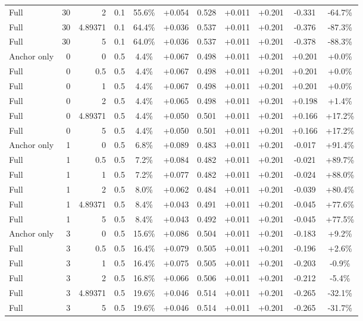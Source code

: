 \begin{table}[htbp]
\begin{tabular}{lrrrccccccc}
Full & 30 & 2 & 0.1 & 55.6\% & +0.054 & 0.528 & +0.011 & +0.201 & -0.331 & -64.7\% \\
Full & 30 & 4.89371 & 0.1 & 64.4\% & +0.036 & 0.537 & +0.011 & +0.201 & -0.376 & -87.3\% \\
Full & 30 & 5 & 0.1 & 64.0\% & +0.036 & 0.537 & +0.011 & +0.201 & -0.378 & -88.3\% \\
Anchor only & 0 & 0 & 0.5 & 4.4\% & +0.067 & 0.498 & +0.011 & +0.201 & +0.201 & +0.0\% \\
Full & 0 & 0.5 & 0.5 & 4.4\% & +0.067 & 0.498 & +0.011 & +0.201 & +0.201 & +0.0\% \\
Full & 0 & 1 & 0.5 & 4.4\% & +0.067 & 0.498 & +0.011 & +0.201 & +0.201 & +0.0\% \\
Full & 0 & 2 & 0.5 & 4.4\% & +0.065 & 0.498 & +0.011 & +0.201 & +0.198 & +1.4\% \\
Full & 0 & 4.89371 & 0.5 & 4.4\% & +0.050 & 0.501 & +0.011 & +0.201 & +0.166 & +17.2\% \\
Full & 0 & 5 & 0.5 & 4.4\% & +0.050 & 0.501 & +0.011 & +0.201 & +0.166 & +17.2\% \\
Anchor only & 1 & 0 & 0.5 & 6.8\% & +0.089 & 0.483 & +0.011 & +0.201 & -0.017 & +91.4\% \\
Full & 1 & 0.5 & 0.5 & 7.2\% & +0.084 & 0.482 & +0.011 & +0.201 & -0.021 & +89.7\% \\
Full & 1 & 1 & 0.5 & 7.2\% & +0.077 & 0.482 & +0.011 & +0.201 & -0.024 & +88.0\% \\
Full & 1 & 2 & 0.5 & 8.0\% & +0.062 & 0.484 & +0.011 & +0.201 & -0.039 & +80.4\% \\
Full & 1 & 4.89371 & 0.5 & 8.4\% & +0.043 & 0.491 & +0.011 & +0.201 & -0.045 & +77.6\% \\
Full & 1 & 5 & 0.5 & 8.4\% & +0.043 & 0.492 & +0.011 & +0.201 & -0.045 & +77.5\% \\
Anchor only & 3 & 0 & 0.5 & 15.6\% & +0.086 & 0.504 & +0.011 & +0.201 & -0.183 & +9.2\% \\
Full & 3 & 0.5 & 0.5 & 16.4\% & +0.079 & 0.505 & +0.011 & +0.201 & -0.196 & +2.6\% \\
Full & 3 & 1 & 0.5 & 16.4\% & +0.075 & 0.505 & +0.011 & +0.201 & -0.203 & -0.9\% \\
Full & 3 & 2 & 0.5 & 16.8\% & +0.066 & 0.506 & +0.011 & +0.201 & -0.212 & -5.4\% \\
Full & 3 & 4.89371 & 0.5 & 19.6\% & +0.046 & 0.514 & +0.011 & +0.201 & -0.265 & -32.1\% \\
Full & 3 & 5 & 0.5 & 19.6\% & +0.046 & 0.514 & +0.011 & +0.201 & -0.265 & -31.7\% \\

\end{tabular}
\end{table}
